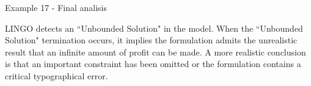 \begin{frame}{Example 17 - Final analisis}

LINGO detects an ``Unbounded Solution" in the model.
When the ``Unbounded Solution" termination occurs, it implies the formulation
admits the unrealistic result that an infinite amount of profit can be made.
A more realistic conclusion is that an important constraint has been omitted or
the formulation contains a critical typographical error.

\end{frame}
